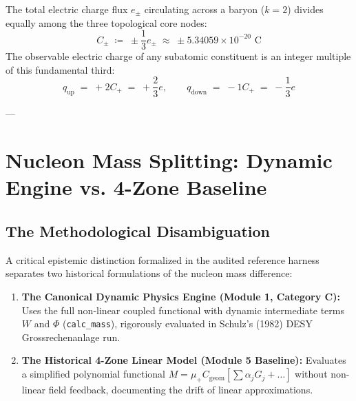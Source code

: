 \documentclass[
    12pt,
    a4paper,
    headings=normal,
    twoside=false,
    open=any,
    parskip=half
]{scrbook}
\begin{document}
\begin{phystheorem}\label{thm:ch3_fractional_charge_tripartition}
The total electric charge flux $e_\pm$ circulating across a baryon ($k = 2$) divides equally among the three topological core nodes:
\begin{equation}
\boxed{C_\pm \;\coloneqq\; \pm \frac{1}{3} e_\pm \;\approx\; \pm 5.34059 \times 10^{-20} \text{ C}}
\label{eq:ch3_fractional_charge_step}
\end{equation}
The observable electric charge of any subatomic constituent is an integer multiple of this fundamental third:
\begin{equation}
q_{\text{up}} \;=\; +2 C_+ \;=\; +\frac{2}{3}e, \qquad q_{\text{down}} \;=\; -1 C_+ \;=\; -\frac{1}{3}e
\end{equation}
\end{phystheorem}

---

\section{Nucleon Mass Splitting: Dynamic Engine vs. 4-Zone Baseline}
\label{sec:ch3_nucleon_mass_splitting_derivation}

\subsection{The Methodological Disambiguation}

A critical epistemic distinction formalized in the audited reference harness separates two historical formulations of the nucleon mass difference:
\begin{enumerate}[label=\textbf{\arabic*.}]
    \item \textbf{The Canonical Dynamic Physics Engine (Module 1, Category C):} Uses the full non-linear coupled functional with dynamic intermediate terms $W$ and $\Phi$ (\texttt{calc\_mass}), rigorously evaluated in Schulz's (1982) DESY Grossrechenanlage run.
    \item \textbf{The Historical 4-Zone Linear Model (Module 5 Baseline):} Evaluates a simplified polynomial functional $M = \mu_+ C_{\text{geom}} [\sum \alpha_j G_j + \dots]$ without non-linear field feedback, documenting the drift of linear approximations.
\end{enumerate}
\end{document}

